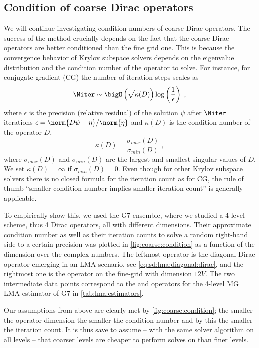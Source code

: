 \subsection{Condition of coarse Dirac operators}
\label{sec:numerics:coarse:condition}

We will continue investigating condition numbers of coarse Dirac operators.
The success of the method crucially depends on the fact that the coarse Dirac operators are better conditioned than the fine grid one.
This is because the convergence behavior of Krylov subspace solvers depends on the eigenvalue distribution and the condition number of the operator to solve.
For instance, for conjugate gradient (CG) the number of iteration steps scales as~\cite{shewchuk1994introduction}
\begin{equation}
\Niter \sim \bigO\left(\sqrt{\kappa(D)}\right) \log\left(\frac{1}{\epsilon}\right) \;,
\end{equation}
where $\epsilon$ is the precision (relative residual) of the solution $\psi$ after $\Niter$ iterations $\epsilon = \norm{D \psi - \eta}/\norm{\eta}$ and $\kappa(D)$ is the condition number of the operator $D$,
\begin{equation}
\kappa(D) = \frac{ \sigma_{max}(D) }{ \sigma_{min}(D) } \;,
\end{equation}
where $\sigma_{max}(D)$ and $\sigma_{min}(D)$ are the largest and smallest singular values of $D$.
We set $\kappa(D) = \infty$ if $\sigma_{min}(D) = 0$.
Even though for other Krylov subspace solvers there is no closed formula for the iteration count as for CG, the rule of thumb ``smaller condition number implies smaller iteration count'' is generally applicable.

To empirically show this, we used the G7 ensemble, where we studied a 4-level scheme, thus \num{4} Dirac operators, all with different dimensions.
Their approximate condition number as well as their iteration counts to solve a random right-hand side to a certain precision was plotted in \cref{fig:coarse:condition} as a function of the dimension over the complex numbers.
The leftmost operator is the diagonal Dirac operator emerging in an LMA scenario, see \cref{eq:sd:lma:diagonal:dirac}, and the rightmost one is the operator on the fine-grid with dimension $12 V$.
The two intermediate data points correspond to the  and  operators for the 4-level MG LMA estimator of G7 in \cref{tab:lma:estimators}.

Our assumptions from above are clearly met by \cref{fig:coarse:condition}; the smaller the operator dimension the smaller the condition number and by this the smaller the iteration count.
It is thus save to assume -- with the same solver algorithm on all levels -- that coarser levels are cheaper to perform solves on than finer levels.

